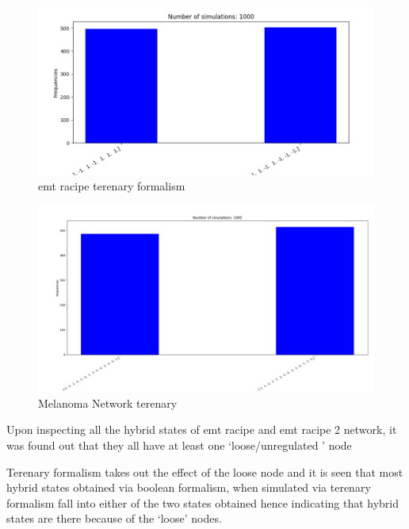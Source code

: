 \documentclass{article}
\begin{document}
\begin{figure}[H]\centering\includegraphics[scale=0.4]{img/emtracipeterenary.png}
	\caption{emt racipe terenary formalism}


\end{figure}


\begin{figure}[H]\centering
	\includegraphics[scale=0.2]{img/melanomaterenarysim.png}
	\caption{Melanoma Network terenary }
\end{figure}





Upon inspecting all the hybrid states of emt racipe and emt racipe 2 network, it was found out that they all have at least one `loose/unregulated ' node 

Terenary formalism takes out the effect of the loose node and it is seen that most hybrid states obtained via boolean formalism, when simulated via terenary formalism fall into either of the two states obtained hence indicating that hybrid states are there because of the  `loose' nodes.  
\end{document}
